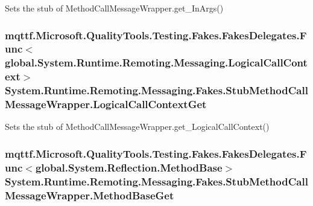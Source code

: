 Sets the stub of Method\-Call\-Message\-Wrapper.\-get\-\_\-\-In\-Args()

\hypertarget{class_system_1_1_runtime_1_1_remoting_1_1_messaging_1_1_fakes_1_1_stub_method_call_message_wrapper_accd09925f14f42f9c477e688cdb212b8}{
\subsubsection[{Logical\-Call\-Context\-Get}]{\setlength{\rightskip}{0pt plus 5cm}mqttf.\-Microsoft.\-Quality\-Tools.\-Testing.\-Fakes.\-Fakes\-Delegates.\-Func$<$global.\-System.\-Runtime.\-Remoting.\-Messaging.\-Logical\-Call\-Context$>$ System.\-Runtime.\-Remoting.\-Messaging.\-Fakes.\-Stub\-Method\-Call\-Message\-Wrapper.\-Logical\-Call\-Context\-Get}}\label{class_system_1_1_runtime_1_1_remoting_1_1_messaging_1_1_fakes_1_1_stub_method_call_message_wrapper_accd09925f14f42f9c477e688cdb212b8}


Sets the stub of Method\-Call\-Message\-Wrapper.\-get\-\_\-\-Logical\-Call\-Context()

\hypertarget{class_system_1_1_runtime_1_1_remoting_1_1_messaging_1_1_fakes_1_1_stub_method_call_message_wrapper_ab135c9d1a65c5d9274ed114bb614c0ab}{
\subsubsection[{Method\-Base\-Get}]{\setlength{\rightskip}{0pt plus 5cm}mqttf.\-Microsoft.\-Quality\-Tools.\-Testing.\-Fakes.\-Fakes\-Delegates.\-Func$<$global.\-System.\-Reflection.\-Method\-Base$>$ System.\-Runtime.\-Remoting.\-Messaging.\-Fakes.\-Stub\-Method\-Call\-Message\-Wrapper.\-Method\-Base\-Get}}\label{class_system_1_1_runtime_1_1_remoting_1_1_messaging_1_1_fakes_1_1_stub_method_call_message_wrapper_ab135c9d1a65c5d9274ed114bb614c0ab}


